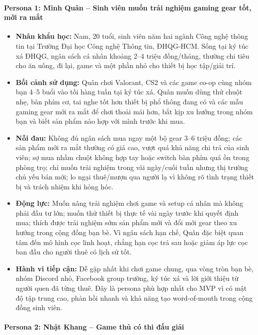 \paragraph{Persona 1: Minh Quân -- Sinh viên muốn trải nghiệm gaming gear tốt, mới ra mắt}

\begin{itemize}
    \item \textbf{Nhân khẩu học:} Nam, 20 tuổi, sinh viên năm hai ngành Công nghệ thông tin tại Trường Đại học Công nghệ Thông tin, ĐHQG-HCM. Sống tại ký túc xá ĐHQG, ngân sách cá nhân khoảng 2--4 triệu đồng/tháng, thường chi tiêu cho ăn uống, đi lại, game và một phần nhỏ cho thiết bị học tập/giải trí.
    \item \textbf{Bối cảnh sử dụng:} Quân chơi Valorant, CS2 và các game co-op cùng nhóm bạn 4--5 buổi vào tối hàng tuần tại ký túc xá. Quân muốn dùng thử chuột nhẹ, bàn phím cơ, tai nghe tốt hơn thiết bị phổ thông đang có và các mẫu gaming gear mới ra mắt để chơi thoải mái hơn, bắt kịp xu hướng trong nhóm bạn và biết sản phẩm nào hợp với mình trước khi mua.
    \item \textbf{Nỗi đau:} Không đủ ngân sách mua ngay một bộ gear 3--6 triệu đồng; các sản phẩm mới ra mắt thường có giá cao, vượt quá khả năng chi trả của sinh viên; sợ mua nhầm chuột không hợp tay hoặc switch bàn phím quá ồn trong phòng trọ; chỉ muốn trải nghiệm trong vài ngày/cuối tuần nhưng thị trường chủ yếu bán mới; lo ngại thuê/mượn qua người lạ vì không rõ tình trạng thiết bị và trách nhiệm khi hỏng hóc.
    \item \textbf{Động lực:} Muốn nâng trải nghiệm chơi game và setup cá nhân mà không phải đầu tư lớn; muốn thử thiết bị thực tế vài ngày trước khi quyết định mua; thích được trải nghiệm sớm sản phẩm mới và đổi mới gear theo xu hướng trong cộng đồng bạn bè. Vì ngân sách hạn chế, Quân đặc biệt quan tâm đến mô hình cọc linh hoạt, chẳng hạn cọc trả sau hoặc giảm áp lực cọc ban đầu cho người thuê có lịch sử tốt.
    \item \textbf{Hành vi tiếp cận:} Dễ gặp nhất khi chơi game chung, qua vòng tròn bạn bè, nhóm Discord nhỏ, Facebook group trường, ký túc xá và lời giới thiệu từ người quen đã từng thuê. Đây là persona phù hợp nhất cho MVP vì có mật độ tập trung cao, phản hồi nhanh và khả năng tạo word-of-mouth trong cộng đồng sinh viên.
\end{itemize}

\paragraph{Persona 2: Nhật Khang -- Game thủ có thi đấu giải}

